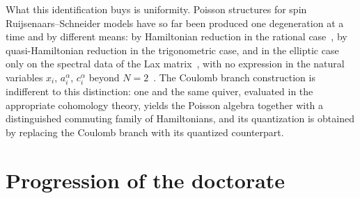 What this identification buys is uniformity. Poisson structures for spin Ruijsenaars--Schneider models have so far been produced one degeneration at a time and by different means: by Hamiltonian reduction in the rational case~\cite{arutyunov_hamiltonian_1998}, by quasi-Hamiltonian reduction in the trigonometric case, and in the elliptic case only on the spectral data of the Lax matrix~\cite{krichever_elliptic_1998}, with no expression in the natural variables $x_i$, $a^\alpha_i$, $c^\alpha_i$ beyond $N=2$~\cite{soloviev_hamiltonian_2008}. The Coulomb branch construction is indifferent to this distinction: one and the same quiver, evaluated in the appropriate cohomology theory, yields the Poisson algebra together with a distinguished commuting family of Hamiltonians, and its quantization is obtained by replacing the Coulomb branch with its quantized counterpart.

\section{Progression of the doctorate}

